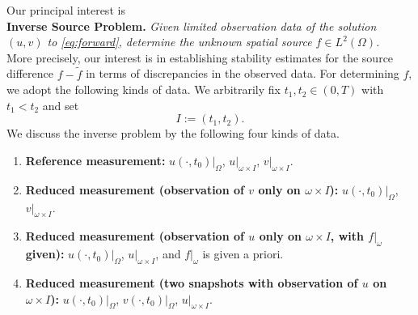 \documentclass[12pt]{amsart}
\theoremstyle{plain}
\theoremstyle{definition}
\theoremstyle{remark}
\begin{document}
Our principal interest is 
\\
\medskip
\noindent\textbf{Inverse Source Problem.}
\emph{Given limited observation data of the solution $(u,v)$ to 
\eqref{eq:forward}, determine the unknown spatial source $f\in L^2(\Omega)$.}
\\

More precisely, our interest is in establishing stability estimates for the
source difference $f - \tilde{f}$ in terms of discrepancies in the observed
data. For determining $f$, we adopt the following kinds of data.
We arbitrarily fix $t_1, t_2 \in (0,T)$ with $t_1 < t_2$ and set 
\begin{equation}
 I:= (t_1, t_2).
 \label{eq:4}
\end{equation}
We discuss the inverse problem by the following four kinds of data.
\begin{enumerate}[label=$(\mathcal{M}_{\arabic*})$, leftmargin=3.5em]
\item\label{M1} \textbf{Reference measurement:}
$u(\cdot,t_0)|_\Omega$, $u|_{\omega\times I}$, $v|_{\omega\times I}$.
\item\label{M2} \textbf{Reduced measurement (observation of $v$ only on
$\omega\times I$):}
$u(\cdot,t_0)|_\Omega$, $v|_{\omega\times I}$.
\item\label{M3} \textbf{Reduced measurement (observation of $u$ only on
$\omega\times I$, with $f|_\omega$ given):}
$u(\cdot,t_0)|_\Omega$, $u|_{\omega\times I}$, and $f|_\omega$ is given
a priori.
\item\label{M4} \textbf{Reduced measurement (two snapshots with observation
of $u$ on $\omega\times I$):}
$u(\cdot,t_0)|_\Omega$, $v(\cdot,t_0)|_\Omega$, $u|_{\omega\times I}$.
\end{enumerate}
\end{document}
